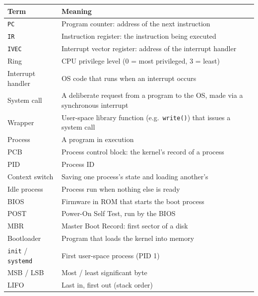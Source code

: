 \documentclass{article}
\newcommand{\reg}[1]{\texttt{#1}}
\begin{document}
\begin{table}[H]
	\centering
	\begin{tabular}{lp{}}
		\toprule
		\textbf{Term} & \textbf{Meaning} \\
		\midrule
		\reg{PC} & Program counter: address of the next instruction \\
		\reg{IR} & Instruction register: the instruction being executed \\
		\reg{IVEC} & Interrupt vector register: address of the interrupt handler \\
		Ring & CPU privilege level (0 = most privileged, 3 = least) \\
		Interrupt handler & OS code that runs when an interrupt occurs \\
		System call & A deliberate request from a program to the OS, made via a synchronous interrupt \\
		Wrapper & User-space library function (e.g.\ \texttt{write()}) that issues a system call \\
		Process & A program in execution \\
		PCB & Process control block: the kernel's record of a process \\
		PID & Process ID \\
		Context switch & Saving one process's state and loading another's \\
		Idle process & Process run when nothing else is ready \\
		BIOS & Firmware in ROM that starts the boot process \\
		POST & Power-On Self Test, run by the BIOS \\
		MBR & Master Boot Record: first sector of a disk \\
		Bootloader & Program that loads the kernel into memory \\
		\texttt{init} / \texttt{systemd} & First user-space process (PID 1) \\
		MSB / LSB & Most / least significant byte \\
		LIFO & Last in, first out (stack order) \\
		\bottomrule
	\end{tabular}
\end{table}
\end{document}
